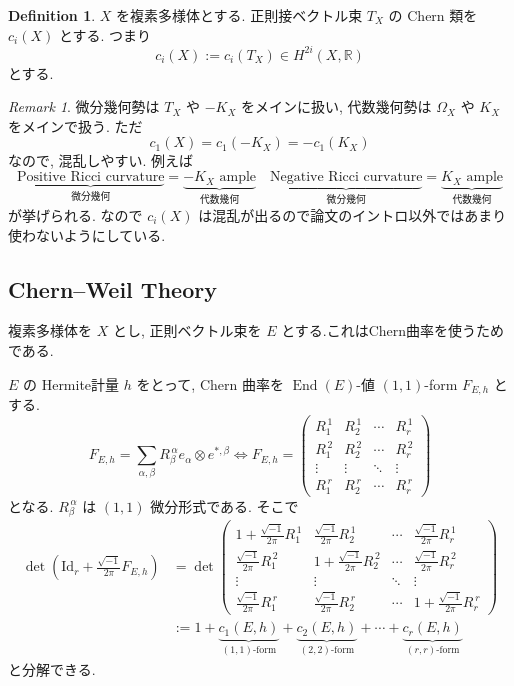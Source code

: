 \documentclass[dvipdfmx,a4paper,11pt]{article} %
\theoremstyle{definition}
\newtheorem{defn}[thm]{Definition}
\theoremstyle{remark}
\newtheorem{rem}[thm]{Remark}
\numberwithin{equation}{section}
\newcommand{\End}[0]{\operatorname{End}}
\newcommand{\R}{\mathbb{R}}
\begin{document}
\begin{defn}
\(X\) を複素多様体とする. 正則接ベクトル束 \(T_X\) の Chern 類を \(c_i(X)\) とする. つまり
\[
c_i(X):=c_i(T_X) \in H^{2i}(X, \R)
\]
とする.
\end{defn}
\begin{rem}
微分幾何勢は \(T_X\) や \(-K_X\) をメインに扱い, 代数幾何勢は \(\Omega_{X}\) や \(K_X\) をメインで扱う. ただ
\[
c_1(X)=c_1(-K_X)=-c_1(K_X)
\]
なので, 混乱しやすい. 例えば
\[
\underbrace{\text{Positive Ricci curvature}}_{\text{微分幾何}}
=
\underbrace{\text{\(-K_X\) ample}}_{\text{代数幾何}}
\quad
\underbrace{\text{Negative Ricci curvature}}_{\text{微分幾何}}
=
\underbrace{\text{\(K_X\) ample}}_{\text{代数幾何}}
\]
が挙げられる. なので \(c_i(X)\) は混乱が出るので論文のイントロ以外ではあまり使わないようにしている.
\end{rem}

\subsection{Chern--Weil Theory}
\begin{tcolorbox}[mybox]
複素多様体を \(X\) とし, 正則ベクトル束を \(E\) とする.これはChern曲率を使うためである. 
\end{tcolorbox}

\(E\) の Hermite計量 \(h\) をとって, Chern 曲率を \(\End(E)\)-値 \((1,1)\)-form \(F_{E,h}\) とする.
\[
F_{E,h}=
\sum_{\alpha,\beta}R_\beta^{\,\alpha}e_{\alpha} \otimes e^{*,\beta}
\Leftrightarrow 
F_{E,h}
=
\begin{pmatrix}
R_1^{\,1} & R_2^{\,1}& \cdots & R_r^{\,1}\\
R_1^{\,2}&R_2^{\,2}& \cdots & R_r^{\,2}\\
\vdots & \vdots & \ddots & \vdots\\
R_1^{\,r}&R_2^{\,r}& \cdots &R_r^{\,r}
\end{pmatrix}
\]
となる. \(R_\beta^{\,\alpha}\) は \((1,1)\) 微分形式である. そこで
\begin{equation}
\begin{aligned}
\det\left(\mathrm{Id}_r+\frac{\sqrt{-1}}{2\pi }F_{E,h}\right)
&=\det
\begin{pmatrix}
1+\frac{\sqrt{-1}}{2\pi }R_1^{\,1} & \frac{\sqrt{-1}}{2\pi }R_2^{\,1}& \cdots &\frac{\sqrt{-1}}{2\pi } R_r^{\,1}\\
\frac{\sqrt{-1}}{2\pi }R_1^{\,2}&1+\frac{\sqrt{-1}}{2\pi }R_2^{\,2}& \cdots & \frac{\sqrt{-1}}{2\pi }R_r^{\,2}\\
\vdots & \vdots & \ddots & \vdots\\
\frac{\sqrt{-1}}{2\pi }R_1^{\,r}&\frac{\sqrt{-1}}{2\pi }R_2^{\,r}& \cdots &1+\frac{\sqrt{-1}}{2\pi }R_r^{\,r}
\end{pmatrix}
\\
&:=1+\underbrace{c_1(E, h)}_{\text{\((1,1)\)-form}}+
\underbrace{c_2(E, h)}_{\text{\((2,2)\)-form}}+\cdots+
\underbrace{c_r(E, h)}_{\text{\((r,r)\)-form}}
\end{aligned}
\end{equation}
と分解できる. 
\end{document}
